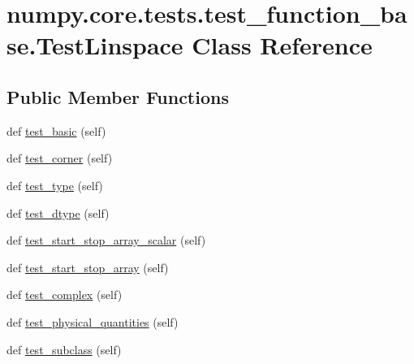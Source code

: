 \hypertarget{classnumpy_1_1core_1_1tests_1_1test__function__base_1_1TestLinspace}{}\section{numpy.\+core.\+tests.\+test\+\_\+function\+\_\+base.\+Test\+Linspace Class Reference}
\label{classnumpy_1_1core_1_1tests_1_1test__function__base_1_1TestLinspace}
\subsection*{Public Member Functions}
\begin{DoxyCompactItemize}
\item 
def \hyperlink{classnumpy_1_1core_1_1tests_1_1test__function__base_1_1TestLinspace_ae183123fd5c5b8ce24745ea5a3823ca2}{test\+\_\+basic} (self)
\item 
def \hyperlink{classnumpy_1_1core_1_1tests_1_1test__function__base_1_1TestLinspace_a0f15580e43ce83887b850cd1a6df75d2}{test\+\_\+corner} (self)
\item 
def \hyperlink{classnumpy_1_1core_1_1tests_1_1test__function__base_1_1TestLinspace_ae60ff6825cd04b6d7a5f270ce40178d8}{test\+\_\+type} (self)
\item 
def \hyperlink{classnumpy_1_1core_1_1tests_1_1test__function__base_1_1TestLinspace_a6a22e4d4c99b37d9134ed4ca0c4c360b}{test\+\_\+dtype} (self)
\item 
def \hyperlink{classnumpy_1_1core_1_1tests_1_1test__function__base_1_1TestLinspace_a19caf6cfeccfbe0be423ed3305c2c76c}{test\+\_\+start\+\_\+stop\+\_\+array\+\_\+scalar} (self)
\item 
def \hyperlink{classnumpy_1_1core_1_1tests_1_1test__function__base_1_1TestLinspace_abc33eeae8e5ef88559746e66766f1437}{test\+\_\+start\+\_\+stop\+\_\+array} (self)
\item 
def \hyperlink{classnumpy_1_1core_1_1tests_1_1test__function__base_1_1TestLinspace_adc4cde1b223edcce6a1b005aa4189f42}{test\+\_\+complex} (self)
\item 
def \hyperlink{classnumpy_1_1core_1_1tests_1_1test__function__base_1_1TestLinspace_a16947e1420938ea4e03754bdf61366c5}{test\+\_\+physical\+\_\+quantities} (self)
\item 
def \hyperlink{classnumpy_1_1core_1_1tests_1_1test__function__base_1_1TestLinspace_aa911dff9d381dc991022d1a58927d016}{test\+\_\+subclass} (self)

\end{DoxyCompactItemize}
